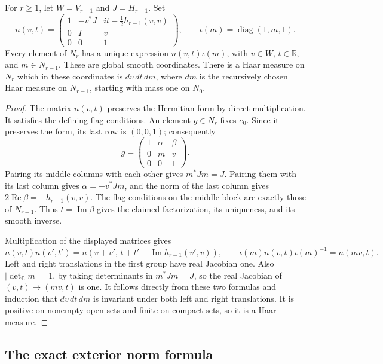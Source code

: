 \begin{lemma}\label{ju-heisenberg}
For \(r\geq1\), let \(W=V_{r-1}\) and \(J=H_{r-1}\).
Set
\[
 n(v,t)=
 \begin{pmatrix}
 1&-v^*J&it-\tfrac12 h_{r-1}(v,v)\\
 0&I&v\\0&0&1
 \end{pmatrix},\qquad
 \iota(m)=\operatorname{diag}(1,m,1).
\]
Every element of \(N_r\) has a unique expression
\(n(v,t)\iota(m)\), with \(v\in W\), \(t\in\mathbb R\),
and \(m\in N_{r-1}\).  These are global smooth coordinates.
There is a Haar measure on \(N_r\) which in these coordinates is
\(dv\,dt\,dm\), where \(dm\) is the recursively chosen Haar
measure on \(N_{r-1}\), starting with mass one on \(N_0\).
\end{lemma}

\begin{proof}
The matrix \(n(v,t)\) preserves the Hermitian form by direct
multiplication.  It satisfies the defining flag conditions.
An element \(g\in N_r\) fixes \(e_0\).  Since it preserves the
form, its last row is \((0,0,1)\); consequently
\[
 g=\begin{pmatrix}1&\alpha&\beta\\0&m&v\\0&0&1\end{pmatrix}.
\]
Pairing its middle columns with each other gives \(m^*Jm=J\).
Pairing them with its last column gives
\(\alpha=-v^*Jm\), and the norm of the last column gives
\(2\operatorname{Re}\beta=-h_{r-1}(v,v)\).
The flag conditions on the middle block are exactly those of
\(N_{r-1}\).  Thus \(t=\operatorname{Im}\beta\) gives the
claimed factorization, its uniqueness, and its smooth inverse.

Multiplication of the displayed matrices gives
\[
 n(v,t)n(v',t')=
 n(v+v',\,t+t'-\operatorname{Im}h_{r-1}(v',v)),\qquad
 \iota(m)n(v,t)\iota(m)^{-1}=n(mv,t).
\]
Left and right translations in the first group have real
Jacobian one.  Also \(|\det_{\mathbb C}m|=1\), by taking
determinants in \(m^*Jm=J\), so the real Jacobian of
\((v,t)\mapsto(mv,t)\) is one.
It follows directly from these two formulas and induction that
\(dv\,dt\,dm\) is invariant under both left and right translations.
It is positive on nonempty open sets and finite on compact sets,
so it is a Haar measure.
\end{proof}

\subsection{The exact exterior norm formula}

